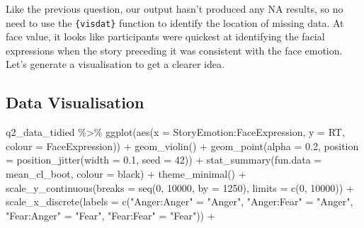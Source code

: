 \documentclass[
]{article}
\newenvironment{Shaded}{\begin{snugshade}}{\end{snugshade}}
\newcommand{\AttributeTok}[1]{\textcolor[rgb]{0.77,0.63,0.00}{#1}}
\newcommand{\DecValTok}[1]{\textcolor[rgb]{0.00,0.00,0.81}{#1}}
\newcommand{\FloatTok}[1]{\textcolor[rgb]{0.00,0.00,0.81}{#1}}
\newcommand{\FunctionTok}[1]{\textcolor[rgb]{0.00,0.00,0.00}{#1}}
\newcommand{\NormalTok}[1]{#1}
\newcommand{\OtherTok}[1]{\textcolor[rgb]{0.56,0.35,0.01}{#1}}
\newcommand{\SpecialCharTok}[1]{\textcolor[rgb]{0.00,0.00,0.00}{#1}}
\newcommand{\StringTok}[1]{\textcolor[rgb]{0.31,0.60,0.02}{#1}}
\begin{document}
Like the previous question, our output hasn't produced any NA results,
so no need to use the \texttt{\{visdat\}} function to identify the
location of missing data. At face value, it looks like participants were
quickest at identifying the facial expressions when the story preceding
it was consistent with the face emotion. Let's generate a visualisation
to get a clearer idea.

\hypertarget{data-visualisation}{%
\subsection{Data Visualisation}\label{data-visualisation}}

\begin{Shaded}
\begin{Highlighting}[]
\NormalTok{q2\_data\_tidied }\SpecialCharTok{\%\textgreater{}\%} 
  \FunctionTok{ggplot}\NormalTok{(}\FunctionTok{aes}\NormalTok{(}\AttributeTok{x =}\NormalTok{ StoryEmotion}\SpecialCharTok{:}\NormalTok{FaceExpression, }\AttributeTok{y =}\NormalTok{ RT, }\AttributeTok{colour =}\NormalTok{ FaceExpression)) }\SpecialCharTok{+}
  \FunctionTok{geom\_violin}\NormalTok{() }\SpecialCharTok{+}
  \FunctionTok{geom\_point}\NormalTok{(}\AttributeTok{alpha =} \FloatTok{0.2}\NormalTok{, }\AttributeTok{position =} \FunctionTok{position\_jitter}\NormalTok{(}\AttributeTok{width =} \FloatTok{0.1}\NormalTok{, }\AttributeTok{seed =} \DecValTok{42}\NormalTok{)) }\SpecialCharTok{+}
  \FunctionTok{stat\_summary}\NormalTok{(}\AttributeTok{fun.data =} \StringTok{\textquotesingle{}mean\_cl\_boot\textquotesingle{}}\NormalTok{, }\AttributeTok{colour =} \StringTok{\textquotesingle{}black\textquotesingle{}}\NormalTok{) }\SpecialCharTok{+}
  \FunctionTok{theme\_minimal}\NormalTok{() }\SpecialCharTok{+}
  \FunctionTok{scale\_y\_continuous}\NormalTok{(}\AttributeTok{breaks =} \FunctionTok{seq}\NormalTok{(}\DecValTok{0}\NormalTok{, }\DecValTok{10000}\NormalTok{, }\AttributeTok{by =} \DecValTok{1250}\NormalTok{),}
                     \AttributeTok{limits =} \FunctionTok{c}\NormalTok{(}\DecValTok{0}\NormalTok{, }\DecValTok{10000}\NormalTok{)) }\SpecialCharTok{+}
  \FunctionTok{scale\_x\_discrete}\NormalTok{(}\AttributeTok{labels =} \FunctionTok{c}\NormalTok{(}\StringTok{"Anger:Anger"} \OtherTok{=} \StringTok{"Anger"}\NormalTok{,}
                              \StringTok{"Anger:Fear"} \OtherTok{=} \StringTok{"Anger"}\NormalTok{,}
                              \StringTok{"Fear:Anger"} \OtherTok{=} \StringTok{"Fear"}\NormalTok{,}
                              \StringTok{"Fear:Fear"} \OtherTok{=} \StringTok{"Fear"}\NormalTok{)) }\SpecialCharTok{+}

\end{Highlighting}
\end{Shaded}
\end{document}
